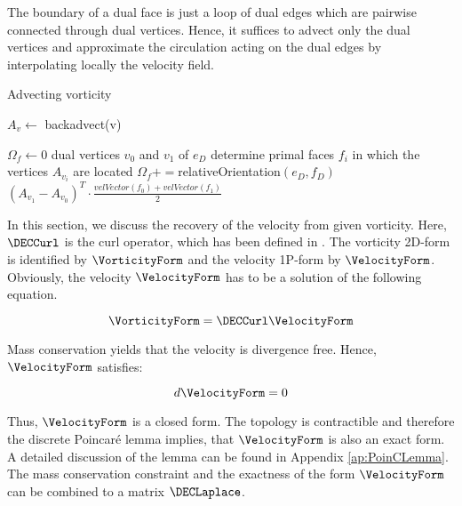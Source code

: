 The boundary of a dual face is just a loop of dual edges which are pairwise connected through dual vertices. 
Hence, it suffices to advect only the dual vertices and approximate the circulation acting on the dual edges by interpolating locally the velocity field.

\newpage

\begin{algorithm}
\caption{Advecting vorticity}
\label{alg:VortAdvection}
\begin{algorithmic}

	\STATE $A_v \gets $ backadvect(v)
\ENDFOR

	\STATE $\Omega_f \gets 0$
		\STATE dual vertices $v_0$ and $v_1$ of $e_D$
		\STATE determine primal faces $f_i$ in which the vertices $A_{v_i}$ are located
		\STATE $\Omega_f +=$relativeOrientation$(e_D,f_D)$ $( A_{v_1} - A_{v_0} )^T \cdot \frac{velVector(f_0) + velVector(f_1)}{2}$ 
	\ENDFOR
\ENDFOR

\end{algorithmic}
\end{algorithm}

\label{sec:VortToVel}
In this section, we discuss the recovery of the velocity from given vorticity.
Here, $\DECCurl$ is the curl operator, which has been defined in .
The vorticity 2D-form is identified by $\VorticityForm$ and the velocity 1P-form by $\VelocityForm$.
Obviously, the velocity $\VelocityForm$ has to be a solution of the following equation.

\begin{equation}
\label{eq:SimpleCurl}
\VorticityForm = \DECCurl \VelocityForm
\end{equation}

Mass conservation yields that the velocity is divergence free. Hence, $\VelocityForm$ satisfies:

\begin{equation}
d \VelocityForm = 0
\end{equation} 

Thus, $\VelocityForm$ is a closed form. The topology is contractible and therefore the discrete Poincaré lemma implies, that $\VelocityForm$ is also an exact form.
A detailed discussion of the lemma can be found in Appendix \ref{ap:PoinCLemma}.
The mass conservation constraint and the exactness of the form $\VelocityForm$ can be combined to a matrix $\DECLaplace$.

